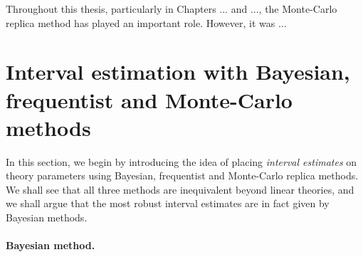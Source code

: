 \documentclass[withindex,glossary]{cam-thesis}
\begin{document}
Throughout this thesis, particularly in Chapters ... and ..., the Monte-Carlo replica method has played an important role. However, it was ...


\section{Interval estimation with Bayesian, frequentist and Monte-Carlo methods}
\label{sec:interval_estimation}

In this section, we begin by introducing the idea of placing \textit{interval estimates} on theory parameters using Bayesian, frequentist and Monte-Carlo replica methods. We shall see that all three methods are inequivalent beyond linear theories, and we shall argue that the most robust interval estimates are in fact given by Bayesian methods.

\paragraph{Bayesian method.} 
\end{document}
